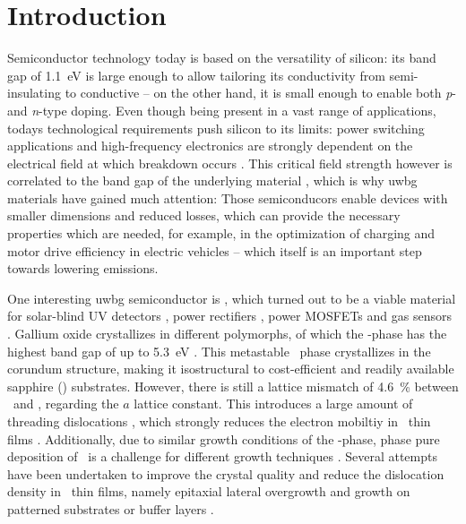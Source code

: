 \chapter{Introduction}
Semiconductor technology today is based on the versatility of silicon: its band gap of \qty{1.1}{\eV} is large enough to allow tailoring its conductivity from semi-insulating to conductive -- on the other hand, it is small enough to enable both \textit{p}- and \textit{n}-type doping.
Even though being present in a vast range of applications, todays technological requirements push silicon to its limits:
power switching applications and high-frequency electronics are strongly dependent on the electrical field at which breakdown occurs
    \cite{higashiwaki2018}.
This critical field strength however is correlated to the band gap of the underlying material
    \cite{slobodyan2022},
which is why \acrfull{uwbg} materials have gained much attention:
Those semiconducors enable devices with smaller dimensions and reduced losses, which can provide the necessary properties which are needed, for example, in the optimization of charging and motor drive efficiency in electric vehicles
    \cite{gupta2024}
-- which itself is an important step towards lowering emissions.

One interesting \acrshort{uwbg} semiconductor is \gao, which turned out to be a viable material for solar-blind UV detectors
    \cite{singhpratiyush2017},
power rectifiers
    \cite{yang2017},
power MOSFETs
    \cite{moser2017}
and gas sensors
    \cite{ogita2001}.
Gallium oxide crystallizes in different polymorphs, of which the \textalpha-phase has the highest band gap of up to \qty{5.3}{\eV}
    \cite{hassa2021a}.
This metastable \gao\ phase crystallizes in the corundum structure, making it isostructural to cost-efficient and readily available sapphire (\alo) substrates.
However, there is still a lattice mismatch of \qty{4.6}{\percent} between \agao\ and \alo, regarding the $a$ lattice constant.
This introduces a large amount of threading dislocations
    \cite{kaneko2012},
which strongly reduces the electron mobiltiy in \agao\ thin films
    \cite{takane2023}.
Additionally, due to similar growth conditions of the \textbeta-phase, phase pure deposition of \agao\ is a challenge for different growth techniques
    \cite{bosi2020}.
Several attempts have been undertaken to improve the crystal quality and reduce the dislocation density in \agao\ thin films, namely epitaxial lateral overgrowth
    \cite{kawara2020}
and growth on patterned substrates
    \cite{nikolaev2020}
or buffer layers
    \cite{jinno2016,jinno2018}.

